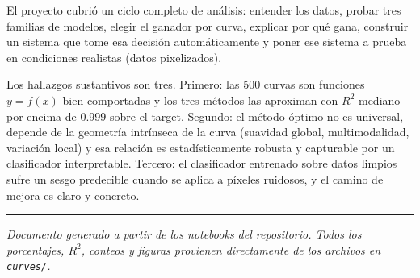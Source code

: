 \documentclass[11pt,a4paper]{article}
\begin{document}
El proyecto cubrió un ciclo completo de análisis: entender los datos, probar tres familias de modelos, elegir el ganador por curva, explicar por qué gana, construir un sistema que tome esa decisión automáticamente y poner ese sistema a prueba en condiciones realistas (datos pixelizados).

Los hallazgos sustantivos son tres. Primero: las 500 curvas son funciones $y = f(x)$ bien comportadas y los tres métodos las aproximan con $R^2$ mediano por encima de 0.999 sobre el target. Segundo: el método óptimo no es universal, depende de la geometría intrínseca de la curva (suavidad global, multimodalidad, variación local) y esa relación es estadísticamente robusta y capturable por un clasificador interpretable. Tercero: el clasificador entrenado sobre datos limpios sufre un sesgo predecible cuando se aplica a píxeles ruidosos, y el camino de mejora es claro y concreto.

\vspace{1em}
\hrule
\vspace{0.5em}
\small\textit{Documento generado a partir de los notebooks del repositorio. Todos los porcentajes, $R^2$, conteos y figuras provienen directamente de los archivos en \texttt{curves/}.}
\end{document}

